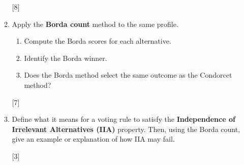 \documentclass[12pt,a4paper]{article}
\makeatletter
\renewcommand{\@oddfoot}{\hfil \arabic{page} \hfil}
\makeatother
\begin{document}
\begin{enumerate}
\begin{enumerate}
        \hfill{[8]}

        \item Apply the \textbf{Borda count} method to the same profile.

        \begin{enumerate}
            \item Compute the Borda scores for each alternative.
            \item Identify the Borda winner.
            \item Does the Borda method select the same outcome as the
            Condorcet method?
        \end{enumerate}

        \hfill{[7]}

        \item Define what it means for a voting rule to satisfy the
        \textbf{Independence of Irrelevant Alternatives (IIA)} property.  
        Then, using the Borda count, give an example or explanation of how IIA
        may fail.

        \hfill{[3]}
    \end{enumerate}
\end{enumerate}

\makeatletter
\renewcommand{\@oddfoot}{\hfil \arabic{page}X \hfil}
\makeatother
\end{document}
